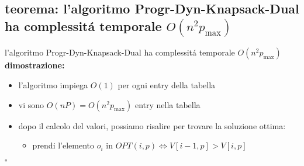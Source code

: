 
\subsection*{teorema: l'algoritmo Progr-Dyn-Knapsack-Dual ha complessit\'a temporale $O(n^2p_{\max})$}
\begin{flushleft}
	l'algoritmo Progr-Dyn-Knapsack-Dual ha complessit\'a temporale $O(n^2p_{\max})$ \newline \\
	\textbf{dimostrazione:}
	\begin{itemize}
		\item l'algoritmo impiega $O(1)$ per ogni entry della tabella
		\item vi sono $O(nP)=O(n^2p_{\max})$ entry nella tabella
		\item dopo il calcolo del valori, possiamo risalire per trovare la soluzione ottima:
		\begin{itemize}
			\item prendi l'elemento $o_i$ in $OPT(i,p)\iff V[i-1,p]>V[i,p]$
		\end{itemize}
	\end{itemize}
	\hfill$\square$
\end{flushleft}


\newpage
